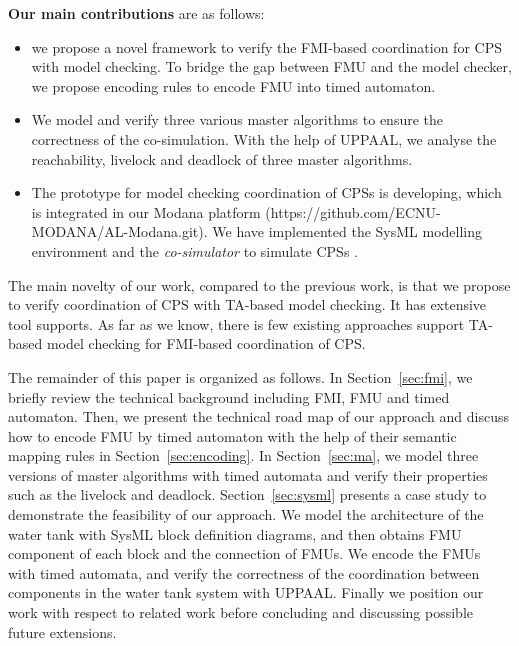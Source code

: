 \textbf{Our main contributions} are as follows:
\begin{itemize}
\item
we propose a novel framework to verify the FMI-based coordination for CPS with model checking. To bridge the gap between FMU and the model checker, we propose encoding rules to encode FMU into timed automaton.
\item
We model and verify three various master algorithms to ensure the correctness of the co-simulation. With the help of UPPAAL, we analyse the reachability, livelock and deadlock of three master algorithms.
\item
The prototype for model checking coordination of CPSs is developing, which is integrated in our Modana platform \cite{Cheng2015Modana}(https://github.com/ECNU-MODANA/AL-Modana.git). We have implemented the SysML modelling environment and the \textit{co-simulator} to simulate CPSs \cite{Fritzson1998Modelica}.
\end{itemize}
The main novelty of our work, compared to the previous work, is that we propose to verify coordination of CPS with TA-based model checking. It has extensive tool supports. As far as we know, there is few existing approaches support TA-based model checking for FMI-based coordination of CPS.

The remainder of this paper is organized as follows. In Section~\ref{sec:fmi}, we briefly review the technical background including FMI, FMU and timed automaton. Then, we present the technical road map of our approach and discuss how to encode FMU by timed automaton with the help of their semantic mapping rules in Section~\ref{sec:encoding}. In Section~\ref{sec:ma}, we model three versions of master algorithms with timed automata and verify their properties such as the livelock and deadlock. Section~\ref{sec:sysml} presents a case study to demonstrate the feasibility of our approach. We model the architecture of the water tank with SysML block definition diagrams, and then obtains FMU component of each block and the connection of FMUs. We encode the FMUs with timed automata, and verify the correctness of the coordination between components in the water tank system with UPPAAL. Finally we position our work with respect to related work before concluding and discussing possible future extensions.




















